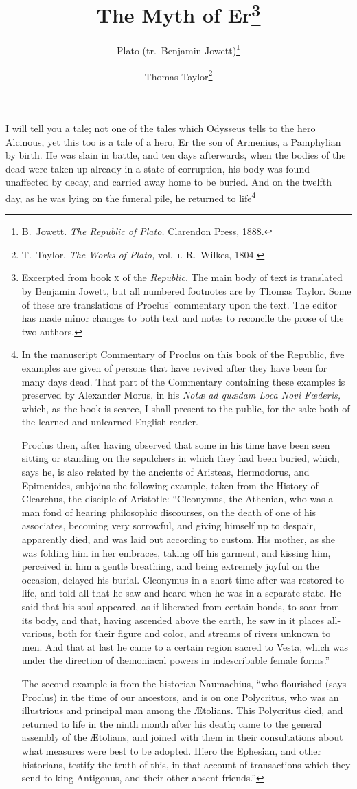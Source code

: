 \documentclass[12pt]{article}
\title{The Myth of Er\footnote{Excerpted from book \textsc{x} of the
\textit{Republic.} The main body of text is translated by Benjamin Jowett, but
all numbered footnotes are by Thomas Taylor. Some of these are translations of
Proclus' commentary upon the text. The editor has made minor changes to both
text and notes to reconcile the prose of the two authors.}}
\author{Plato (tr.~Benjamin Jowett)\footnote{B.~Jowett. \textit{The Republic
of Plato.} Clarendon Press, 1888.} \and Thomas Taylor\footnote{T.~Taylor.
\textit{The Works of Plato,} vol.~\textsc{i}.  R.~Wilkes, 1804.}}
\date{}
\begin{document}
\maketitle

\noindent I will tell you a tale; not one of the tales which Odysseus tells to
the hero Alcinous, yet this too is a tale of a hero, Er the son of Armenius, a
Pamphylian by birth. He was slain in battle, and ten days afterwards, when the
bodies of the dead were taken up already in a state of corruption, his body was
found unaffected by decay, and carried away home to be buried. And on the
twelfth day, as he was lying on the funeral pile, he returned to
life\footnote{In the manuscript Commentary of Proclus on this book of the
Republic, five examples are given of persons that have revived after they have
been for many days dead. That part of the Commentary containing these examples
is preserved by Alexander Morus, in his \textit{Not{\ae} ad qu{\ae}dam Loca
Novi F{\oe}deris,} which, as the book is scarce, I shall present to the public,
for the sake both of the learned and unlearned English reader.

Proclus then, after having observed that some in his time have been seen
sitting or standing on the sepulchers in which they had been buried, which,
says he, is also related by the ancients of Aristeas, Hermodorus, and
Epimenides, subjoins the following example, taken from the History of
Clearchus, the disciple of Aristotle: ``Cleonymus, the Athenian, who was a man
fond of hearing philosophic discourses, on the death of one of his associates,
becoming very sorrowful, and giving himself up to despair, apparently died, and
was laid out according to custom. His mother, as she was folding him in her
embraces, taking off his garment, and kissing him, perceived in him a gentle
breathing, and being extremely joyful on the occasion, delayed his burial.
Cleonymus in a short time after was restored to life, and told all that he saw
and heard when he was in a separate state. He said that his soul appeared, as
if liberated from certain bonds, to soar from its body, and that, having
ascended above the earth, he saw in it places all-various, both for their
figure and color, and streams of rivers unknown to men. And that at last he
came to a certain region sacred to Vesta, which was under the direction of
d{\ae}moniacal powers in indescribable female forms.''

The second example is from the historian Naumachius, ``who flourished (says
Proclus) in the time of our ancestors, and is on one Polycritus, who was an
illustrious and principal man among the {\AE}tolians. This Polycritus died, and
returned to life in the ninth month after his death; came to the general
assembly of the {\AE}tolians, and joined with them in their consultations about
what measures were best to be adopted. Hiero the Ephesian, and other
historians, testify the truth of this, in that account of transactions which
they send to king Antigonus, and their other absent friends.''

}
\end{document}
